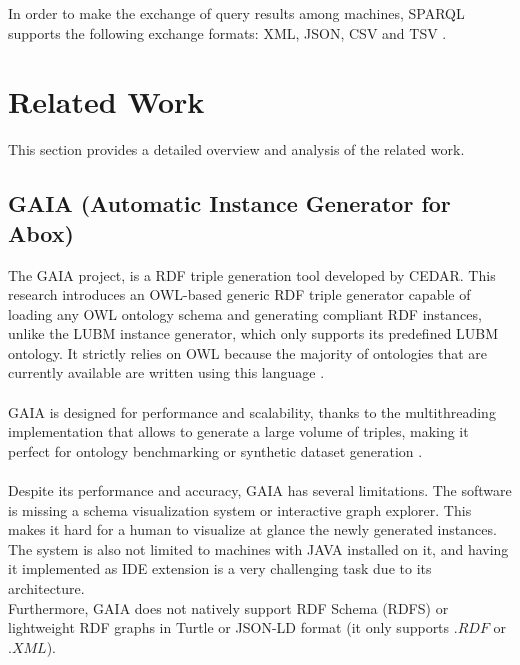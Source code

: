 In order to make the exchange of query results among machines, SPARQL supports the following exchange formats: XML, JSON, CSV and TSV \cite{sparql}.



\section{Related Work \label{sec:tech}}

This section provides a detailed overview and analysis of the related work.

\subsection{GAIA (Automatic Instance Generator for Abox)}

The GAIA project, is a RDF triple generation tool developed by CEDAR. 
This research introduces an OWL-based generic RDF triple generator capable of loading any OWL ontology schema and generating compliant RDF instances, unlike the LUBM instance generator, which only supports its predefined LUBM ontology.
It strictly relies on OWL because the majority of ontologies that are currently available are written using this language \cite{raynaud2014gaia}.
\\
\\
GAIA is designed for performance and scalability, thanks to the multithreading implementation that allows to generate a large volume of triples, making it perfect for ontology benchmarking or synthetic dataset generation \cite{raynaud2014gaia}.
\\
\\
Despite its performance and accuracy, GAIA has several limitations. The software is missing a schema visualization system or interactive graph explorer. This makes it hard for a human to visualize at glance the newly generated instances.
The system is also not limited to machines with JAVA installed on it, and having it implemented as IDE extension is a very challenging task due to its architecture.
\\
Furthermore, GAIA does not natively support RDF Schema (RDFS) or lightweight RDF graphs in Turtle or JSON-LD format (it only supports $.RDF$ or $.XML$).


